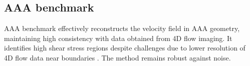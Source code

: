 


\subsection*{AAA benchmark}
AAA benchmark effectively reconstructs the velocity field in AAA geometry, maintaining high consistency with data obtained from 4D flow
imaging. It identifies high shear stress regions despite challenges due to lower resolution of 4D flow data near boundaries .
The method remains robust against noise. 

